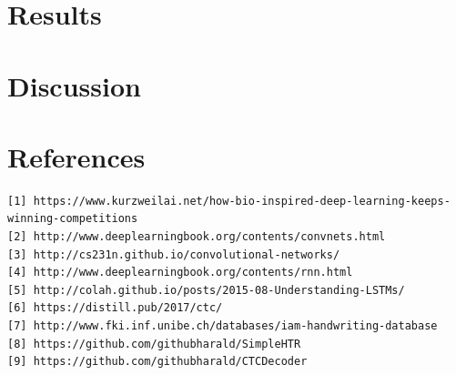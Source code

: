\documentclass{article}
\begin{document}
\newpage
\section{Results}

\newpage
\section{Discussion}

\newpage
\section{References}
\begin{verbatim}
[1] https://www.kurzweilai.net/how-bio-inspired-deep-learning-keeps-winning-competitions
[2] http://www.deeplearningbook.org/contents/convnets.html
[3] http://cs231n.github.io/convolutional-networks/
[4] http://www.deeplearningbook.org/contents/rnn.html
[5] http://colah.github.io/posts/2015-08-Understanding-LSTMs/
[6] https://distill.pub/2017/ctc/
[7] http://www.fki.inf.unibe.ch/databases/iam-handwriting-database
[8] https://github.com/githubharald/SimpleHTR
[9] https://github.com/githubharald/CTCDecoder
\end{verbatim}
\end{document}
